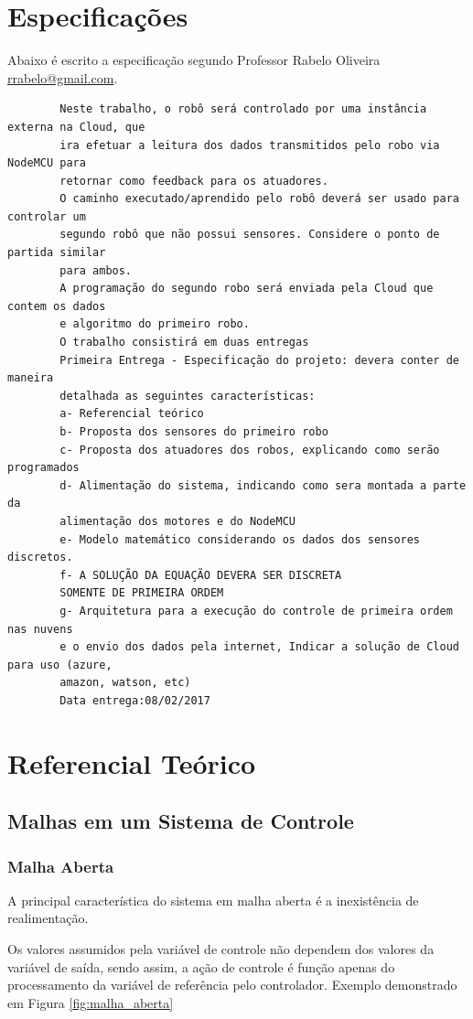 \documentclass[portugues, brazil, a4paper,12pt]{article}
\begin{document}
\section{Especificações} \label{sec:especificacao}
	Abaixo é escrito a especificação segundo Professor Rabelo Oliveira \href{mailto:rrabelo@gmail.com}{rrabelo@gmail.com}.
	\begin{verbatim}
		Neste trabalho, o robô será controlado por uma instância externa na Cloud, que
		ira efetuar a leitura dos dados transmitidos pelo robo via NodeMCU para
		retornar como feedback para os atuadores.
		O caminho executado/aprendido pelo robô deverá ser usado para controlar um
		segundo robô que não possui sensores. Considere o ponto de partida similar
		para ambos.
		A programação do segundo robo será enviada pela Cloud que contem os dados
		e algoritmo do primeiro robo.
		O trabalho consistirá em duas entregas
		Primeira Entrega - Especificação do projeto: devera conter de maneira
		detalhada as seguintes características:
		a- Referencial teórico
		b- Proposta dos sensores do primeiro robo
		c- Proposta dos atuadores dos robos, explicando como serão programados
		d- Alimentação do sistema, indicando como sera montada a parte da
		alimentação dos motores e do NodeMCU
		e- Modelo matemático considerando os dados dos sensores discretos.
		f- A SOLUÇÃO DA EQUAÇÃO DEVERA SER DISCRETA
		SOMENTE DE PRIMEIRA ORDEM
		g- Arquitetura para a execução do controle de primeira ordem nas nuvens
		e o envio dos dados pela internet, Indicar a solução de Cloud para uso (azure,
		amazon, watson, etc)
		Data entrega:08/02/2017
	\end{verbatim}


\section{Referencial Teórico} \label{sec:rt}

	\subsection{Malhas em um Sistema de Controle}

		\subsubsection{Malha Aberta}
			A principal característica do sistema em malha aberta é a inexistência de realimentação.

			Os  valores  assumidos  pela  variável de  controle  não  dependem dos  valores  da  variável  de saída, sendo assim, a  ação  de  controle  é  função  apenas  do processamento da variável de referência pelo controlador. Exemplo demonstrado em Figura \ref{fig:malha_aberta}
\end{document}
